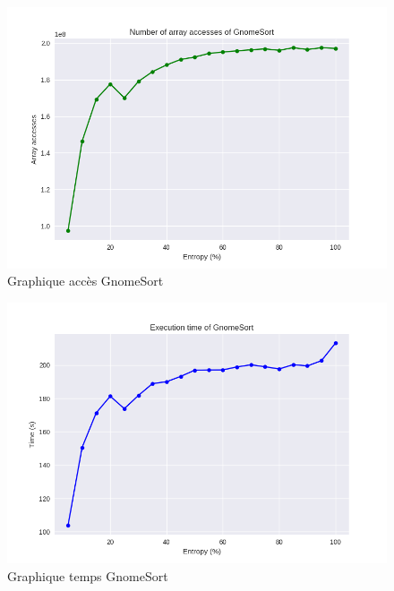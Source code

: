 \documentclass[10pt,a4paper]{article}
\begin{document}
            \begin{figure}
                \centering
                \includegraphics[width=1\textwidth]{graphique/GnomeSort/GraphAccessesGnomeSort.png}
                \caption{Graphique accès GnomeSort}
                \label{fig:mesh1}
            \end{figure}
            \begin{figure}
                \centering
                \includegraphics[width=1\textwidth]{graphique/GnomeSort/GraphTimeGnomeSort.png}
                \caption{Graphique temps GnomeSort}
                \label{fig:mesh1}
            \end{figure}
\end{document}
